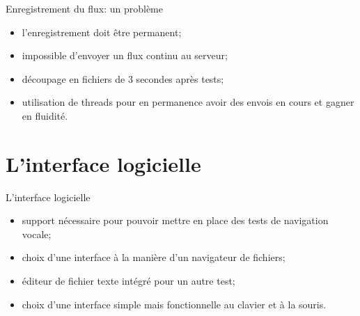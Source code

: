 \documentclass{beamer}
\begin{document}
\begin{frame}{Enregistrement du flux: un problème}

	\begin{itemize}
		\item l'enregistrement doit être permanent;
		\item impossible d'envoyer un flux continu au serveur;
		\item découpage en fichiers de 3 secondes après tests;
		\item utilisation de threads pour en permanence avoir des envois en cours et gagner en fluidité.
	\end{itemize}

\end{frame}

	\section{L'interface logicielle}
	
\begin{frame}{L'interface logicielle}

	\begin{itemize}
		\item support nécessaire pour pouvoir mettre en place des tests de navigation vocale;
		\item choix d'une interface à la manière d'un navigateur de fichiers;
		\item éditeur de fichier texte intégré pour un autre test;
		\item choix d'une interface simple mais fonctionnelle au clavier et à la souris.
	\end{itemize}
	
\end{frame}




	
\end{document}
